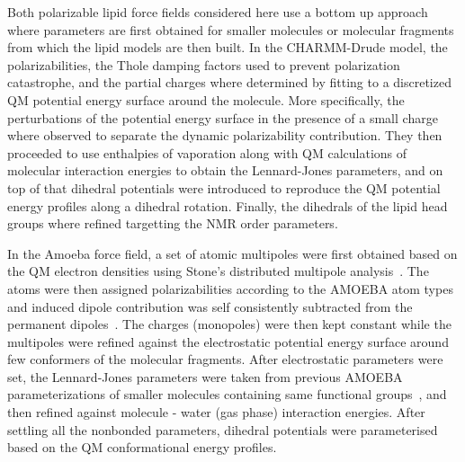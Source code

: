 \documentclass[journal=jacsat,manuscript=article,layout=singlecolumn]{achemso}
\begin{document}
Both polarizable lipid force fields considered here use a bottom up approach where parameters are first obtained for smaller molecules or molecular fragments from which the lipid models are then built.  In the CHARMM-Drude model, the polarizabilities, the Thole damping factors used to prevent polarization catastrophe, and the partial charges where determined by fitting to a discretized QM potential energy surface around the molecule. More specifically, the perturbations of the potential energy surface in the presence of a small charge where observed to separate the dynamic polarizability contribution. They then proceeded to use enthalpies of vaporation along with QM calculations of molecular interaction energies to obtain the Lennard-Jones parameters, and on top of that dihedral potentials were introduced to reproduce the QM potential energy profiles along a dihedral rotation. Finally, the dihedrals of the lipid head groups where refined targetting the NMR order parameters.

In the Amoeba force field, a set of atomic multipoles were first obtained based on the QM electron densities using Stone's distributed multipole analysis~\cite{Stone1981}. The atoms were then assigned polarizabilities according to the AMOEBA atom types and induced dipole contribution was self consistently subtracted from the permanent dipoles~\cite{shi2013proteinamoeba}. The charges (monopoles) were then kept constant while the multipoles were refined against the electrostatic potential energy surface around few conformers of the molecular fragments. %
After electrostatic parameters were set, the Lennard-Jones parameters were taken from previous AMOEBA parameterizations of smaller molecules containing same functional groups~\cite{Ren2011polorganic,shi2011hydration}, and then refined against molecule - water (gas phase) interaction energies. After settling all the nonbonded parameters, dihedral potentials were parameterised based on the QM conformational energy profiles.
\end{document}
